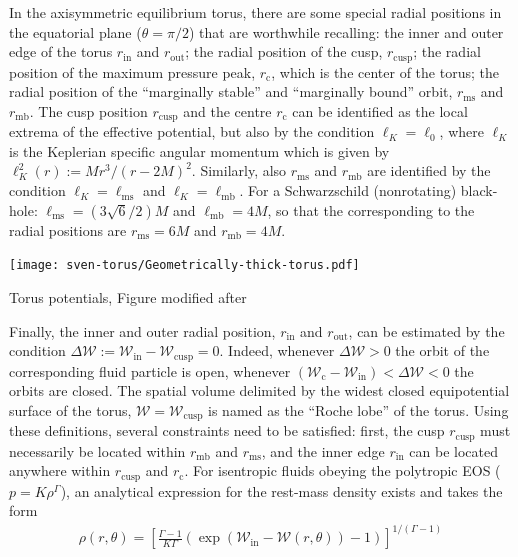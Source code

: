 In the axisymmetric equilibrium torus, there are some special radial
positions in the equatorial plane ($\theta = \pi/2$) that are worthwhile
recalling: the {inner} and {outer} edge of the torus $r_{\text{in}}$ and
$r_{\text{out}}$; the radial position of the {cusp}, $r_{\text{cusp}}$;
the radial position of the maximum pressure peak, $r_{\text{c}}$, which
is the {center of the torus}; the radial position of the 
``{marginally stable}'' and ``{marginally bound}'' orbit, $r_{\text{ms}}$
and $r_{\text{mb}}$. The cusp position $r_{\text{cusp}}$ and the centre
$r_{\text{c}}$ can be identified as the local extrema of the effective
potential, but also by the condition $\ell_K=\ell_0$, where $\ell_K$ is
the {Keplerian specific angular momentum} which is given by $\ell^2_K(r)
:= M r^3 / (r - 2M)^2$. Similarly, also $r_{\text{ms}}$ and
$r_{\text{mb}}$ are identified by the condition $\ell_K =
\ell_{\text{ms}}$ and $\ell_K=\ell_{\text{mb}}$. For a Schwarzschild
(nonrotating) black-hole: $\ell_{\text{ms}} = (3\sqrt{6}/2) M$ and
$\ell_{\text{mb}} = 4 M$, so that the corresponding to the radial
positions are $r_{\text{ms}} = 6 M$ and $r_{\text{mb}} = 4 M$.

\begin{marginfigure}
	\texttt{[image: sven-torus/Geometrically-thick-torus.pdf]}
	\caption[
	Torus potentials, 
	]{Torus potentials, Figure modified after \cite{Font02a}}
\end{marginfigure}

Finally,
the inner and outer radial position, $r_{\text{in}}$ and
$r_{\text{out}}$, can be estimated by the condition $\Delta \mathcal{W}
:= \mathcal{W}_{\text{in}} - \mathcal{W}_{\text{cusp}} = 0$. Indeed,
whenever $\Delta \mathcal{W}>0$ the orbit of the corresponding fluid
particle is open, whenever $(\mathcal{W}_{\text{c}} -
\mathcal{W}_{\text{in}}) < \Delta \mathcal{W}<0$ the orbits are
closed. The spatial volume delimited by the widest closed equipotential
surface of the torus, \ie $\mathcal{W}=\mathcal{W}_{\text{cusp}}$ is
named as the ``{Roche lobe}'' of the torus. Using these definitions,
several constraints need to be satisfied: first, the cusp
$r_{\text{cusp}}$ must necessarily be located within $r_{\text{mb}}$ and
$r_{\text{ms}}$, and the inner edge $r_{\text{in}}$ can be located
anywhere within $r_{\text{cusp}}$ and $r_{\text{c}}$. For isentropic
fluids obeying the {polytropic} EOS ($p = K \rho^{\Gamma}$),
an analytical expression for the rest-mass density exists and takes the
form
%
\begin{align}
\rho(r,\theta) = \left[\frac{\Gamma - 1}{K \Gamma} \left( \exp(
\mathcal{W}_{\text{in}} - \mathcal{W}(r,\theta) ) -
1\right)\right]^{1/\left(\Gamma - 1\right)} \label{eq:rhotorus}
\end{align}

